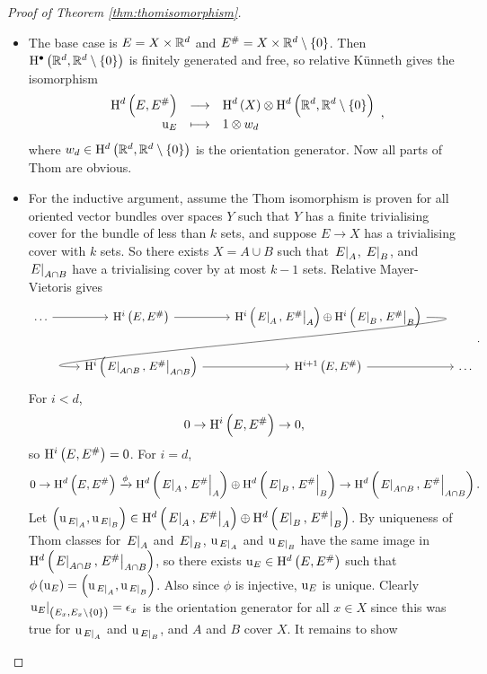 \begin{proof}[Proof of Theorem \ref{thm:thomisomorphism}]
\hfill
\begin{itemize}
\item The base case is $ E = X \times \mathbb{R}^d $ and $ E^\# = X \times \RR^d \setminus \cbr{0} $. Then $ \H^\bullet\br{\RR^d, \RR^d \setminus \cbr{0}} $ is finitely generated and free, so relative K\"unneth gives the isomorphism
$$ \function{\H^d\br{E, E^\#}}{\H^d\br{X} \otimes \H^d\br{\RR^d, \RR^d \setminus \cbr{0}}}{\u_E}{1 \otimes w_d}, $$
where $ w_d \in \H^d\br{\RR^d, \RR^d \setminus \cbr{0}} $ is the orientation generator. Now all parts of Thom are obvious.
\item For the inductive argument, assume the Thom isomorphism is proven for all oriented vector bundles over spaces $ Y $ such that $ Y $ has a finite trivialising cover for the bundle of less than $ k $ sets, and suppose $ E \to X $ has a trivialising cover with $ k $ sets. So there exists $ X = A \cup B $ such that $ \left. E \right|_A $, $ \left. E \right|_B $, and $ \left. E \right|_{A \cap B} $ have a trivialising cover by at most $ k - 1 $ sets. Relative Mayer-Vietoris gives
$$
\begin{tikzcd}
\dots \arrow{r} & \H^i\br{E, E^\#} \arrow{r} & \H^i\br{\eval{E}_A, \eval{E^\#}_A} \oplus \H^i\br{\eval{E}_B, \eval{E^\#}_B} \arrow[in=180, out=0, overlay]{dl} & \\
& \H^i\br{\eval{E}_{A \cap B}, \eval{E^\#}_{A \cap B}} \arrow{r} & \H^{i + 1}\br{E, E^\#} \arrow{r} & \dots
\end{tikzcd}.
$$
For $ i < d $,
$$ 0 \to \H^i\br{E, E^\#} \to 0, $$
so $ \H^i\br{E, E^\#} = 0 $. For $ i = d $,
$$ 0 \to \H^d\br{E, E^\#} \xrightarrow{\phi} \H^d\br{\eval{E}_A, \eval{E^\#}_A} \oplus \H^d\br{\eval{E}_B, \eval{E^\#}_B} \to \H^d\br{\eval{E}_{A \cap B}, \eval{E^\#}_{A \cap B}}. $$
Let $ \br{\u_{\eval{E}_A}, \u_{\eval{E}_B}} \in \H^d\br{\eval{E}_A, \eval{E^\#}_A} \oplus \H^d\br{\eval{E}_B, \eval{E^\#}_B} $. By uniqueness of Thom classes for $ \left. E \right|_A $ and $ \left. E \right|_B $, $ \mathrm{u}_{\left. E \right|_A} $ and $ \mathrm{u}_{\left. E \right|_B} $ have the same image in $ \H^d\br{\eval{E}_{A \cap B}, \eval{E^\#}_{A \cap B}} $, so there exists $ \u_E \in \H^d\br{E, E^\#} $ such that $ \phi\br{\u_E} = \br{\u_{\eval{E}_A}, \u_{\eval{E}_B}} $. Also since $ \phi $ is injective, $ \mathrm{u}_E $ is unique. Clearly $ \eval{\u_E}_{\br{E_x, E_x \setminus \cbr{0}}} = \epsilon_x $ is the orientation generator for all $ x \in X $ since this was true for $ \mathrm{u}_{\left. E \right|_A} $ and $ \mathrm{u}_{\left. E \right|_B} $, and $ A $ and $ B $ cover $ X $. It remains to show

\end{itemize}
\end{proof}
